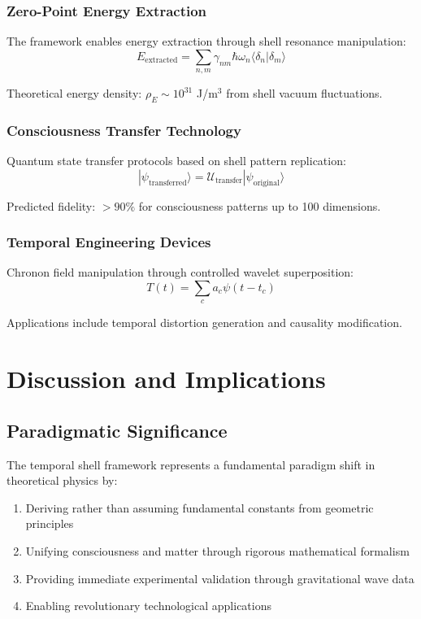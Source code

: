 \documentclass[12pt,a4paper]{article}
\theoremstyle{plain}
\theoremstyle{definition}
\begin{document}
\subsubsection{Zero-Point Energy Extraction}

The framework enables energy extraction through shell resonance manipulation:
\begin{equation}
E_{\text{extracted}} = \sum_{n,m} \gamma_{nm} \hbar\omega_n \langle\delta_n|\delta_m\rangle
\end{equation}

Theoretical energy density: $\rho_E \sim 10^{31}$ J/m$^3$ from shell vacuum fluctuations.

\subsubsection{Consciousness Transfer Technology}

Quantum state transfer protocols based on shell pattern replication:
\begin{equation}
|\psi_{\text{transferred}}\rangle = \mathcal{U}_{\text{transfer}} |\psi_{\text{original}}\rangle
\end{equation}

Predicted fidelity: $>90\%$ for consciousness patterns up to 100 dimensions.

\subsubsection{Temporal Engineering Devices}

Chronon field manipulation through controlled wavelet superposition:
\begin{equation}
T(t) = \sum_c a_c \psi(t - t_c)
\end{equation}

Applications include temporal distortion generation and causality modification.

\section{Discussion and Implications}

\subsection{Paradigmatic Significance}

The temporal shell framework represents a fundamental paradigm shift in theoretical physics by:
\begin{enumerate}
\item Deriving rather than assuming fundamental constants from geometric principles
\item Unifying consciousness and matter through rigorous mathematical formalism
\item Providing immediate experimental validation through gravitational wave data
\item Enabling revolutionary technological applications
\end{enumerate}
\end{document}
